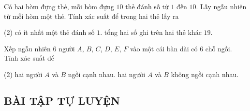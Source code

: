 \begin{vd}
	Có hai hòm đựng thẻ, mỗi hòm đựng $10$ thẻ đánh số từ $1$ đến $10$. Lấy ngẫu nhiên từ mỗi hòm một thẻ. Tính xác suất để trong hai thẻ lấy ra
	\begin{tasks}(2)
		\task có ít nhất một thẻ đánh số $1$.
		\task tổng hai số ghi trên hai thẻ khác $19$.
	\end{tasks}
\end{vd} 

\begin{vd}
	Xếp ngẫu nhiên $6$ người $A$, $B$, $C$, $D$, $E$, $F$ vào một cái bàn dài có $6$ chỗ ngồi. Tính xác suất để 
	\begin{tasks}(2)
		\task hai người $A$ và $B$ ngồi cạnh nhau.
		\task hai người $A$ và $B$ không ngồi cạnh nhau.
	\end{tasks}
\end{vd} 


\subsection{BÀI TẬP TỰ LUYỆN}

